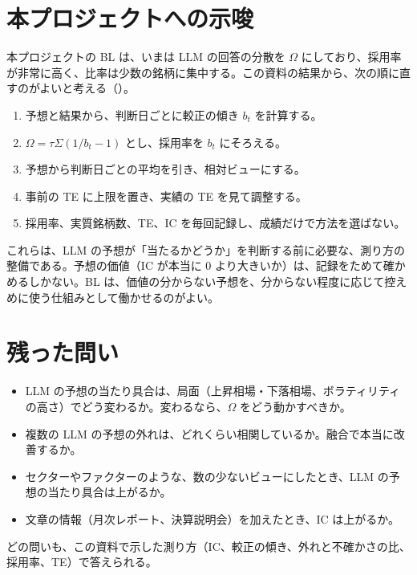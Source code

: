 \section{本プロジェクトへの示唆}

本プロジェクトの BL は、いまは LLM の回答の分散を $\Omega$ にしており、採用率が非常に高く、比率は少数の銘柄に集中する。この資料の結果から、次の順に直すのがよいと考える（）。

\begin{enumerate}
\item 予想と結果から、判断日ごとに較正の傾き $b_t$ を計算する。
\item $\Omega=\tau\Sigma(1/b_t-1)$ とし、採用率を $b_t$ にそろえる。
\item 予想から判断日ごとの平均を引き、相対ビューにする。
\item 事前の TE に上限を置き、実績の TE を見て調整する。
\item 採用率、実質銘柄数、TE、IC を毎回記録し、成績だけで方法を選ばない。
\end{enumerate}

これらは、LLM の予想が「当たるかどうか」を判断する前に必要な、測り方の整備である。予想の価値（IC が本当に 0 より大きいか）は、記録をためて確かめるしかない。BL は、価値の分からない予想を、分からない程度に応じて控えめに使う仕組みとして働かせるのがよい。

\section{残った問い}

\begin{itemize}
\item LLM の予想の当たり具合は、局面（上昇相場・下落相場、ボラティリティの高さ）でどう変わるか。変わるなら、$\Omega$ をどう動かすべきか。
\item 複数の LLM の予想の外れは、どれくらい相関しているか。融合で本当に改善するか。
\item セクターやファクターのような、数の少ないビューにしたとき、LLM の予想の当たり具合は上がるか。
\item 文章の情報（月次レポート、決算説明会）を加えたとき、IC は上がるか。
\end{itemize}

どの問いも、この資料で示した測り方（IC、較正の傾き、外れと不確かさの比、採用率、TE）で答えられる。
